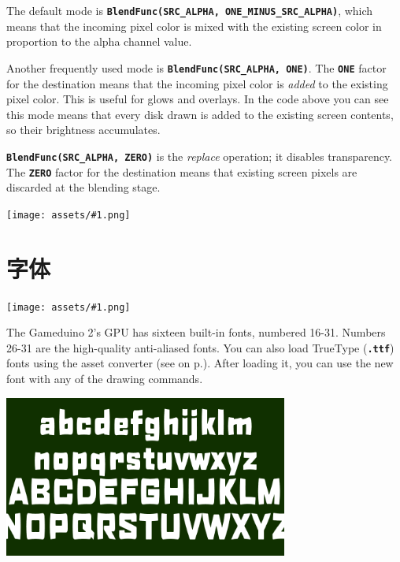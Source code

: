 \documentclass[10pt]{book}
\newcommand{\gdtwos}{Gameduino 2's }
\newcommand{\png}[1]{
\begin{center}
\texttt{[image: assets/\#1.png]}
\end{center}
}
\newcommand{\mach}[1]{\texttt{\textbf{#1}}}
\newcommand{\xref}[1]{\textit{\nameref{#1}} on  p.\pageref{#1}}
\newcommand{\term}[1]{\emph{#1}\index{#1}}
\begin{document}
\begin{CJK}{UTF8}{gkai}
\begin{center}
\end{center}

The default mode is
\mach{BlendFunc(SRC\_ALPHA, ONE\_MINUS\_SRC\_ALPHA)}, which means that the incoming pixel color
is mixed with the existing screen color in proportion to the alpha channel value.

Another frequently used mode is
\mach{BlendFunc(SRC\_ALPHA, ONE)}. The \mach{ONE} factor for the destination means that the
incoming pixel color is \textit{added}
to the existing pixel color.
This is useful for glows and overlays.
In the code above you can see this mode means that every disk drawn is added to the existing screen contents,
so their brightness accumulates.

\mach{BlendFunc(SRC\_ALPHA, ZERO)} is the \term{replace} operation; it disables transparency.
The \mach{ZERO} factor for the destination means that existing screen pixels are discarded at the blending stage.

\png{0069}

\newpage
\section{字体}
\png{fonts0}

The \gdtwos GPU has sixteen built-in fonts, numbered 16-31.
Numbers 26-31 are the high-quality anti-aliased fonts.
You can also load TrueType (\mach{.ttf}) fonts
using the asset converter (see \xref{assets}).
After loading it, you can use the new font with any of the drawing commands.


\begin{center}
\includegraphics[width=0.7\textwidth]{assets/fonts1.png}
\end{center}


\end{CJK}
\end{document}
